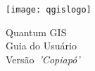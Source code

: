 
\begin{titlepage}
\begin{center}

\begin{center}
\texttt{[image: qgislogo]} 
\end{center}

\Huge{Quantum GIS}\\
\vspace{0.5cm}
\Large{Guia do Usuário} \\
\vspace{0.5cm}
\Large{Versão~\CURRENT \textsl{'Copiapó'}}

\end{center}
\end{titlepage}
